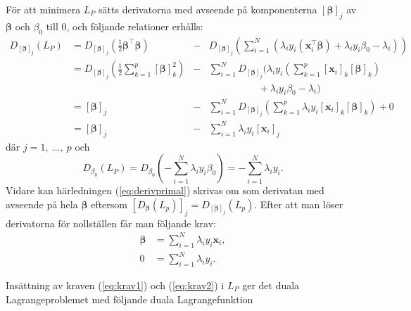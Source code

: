\documentclass[a4paper, 12pt]{report}
\theoremstyle{definition}
\theoremstyle{remark}
\newcommand{\bfbeta}{{\boldsymbol{\beta}}}
\newcommand{\bfx}{\mathbf{x}}
\begin{document}
För att minimera $L_P$ sätts derivatorna med avseende på komponenterna $\left[\bfbeta\right]_j$ av $\bfbeta$ och $\beta_0$ till 0, och följande relationer erhålls:
\begin{equation}\label{eq:derivprimal}
\begin{aligned}
	D_{ \left[\bfbeta\right]_j } \left(L_P\right) &= D_{ \left[\bfbeta\right]_j } \left( \frac{1}{2} \bfbeta^\intercal \bfbeta \right) &- &D_{ \left[\bfbeta\right]_j } \left( \sum_{i=1}^{N} \left( \lambda_i y_i \left( \bfx_i^\intercal\bfbeta \right) + \lambda_i y_i \beta_0 - \lambda_i \right)\right)\\
	&= D_{ \left[\bfbeta\right]_j } \left( \frac{1}{2} \sum_{k=1}^{p} \left[\bfbeta\right]_k^2 \right)
	&- &\sum_{i=1}^{N} D_{ \left[\bfbeta\right]_j }
	\Big(  \lambda_i y_i \left( \sum_{k=1}^{p} \left[\mathbf{x}_i\right]_k \left[ \bfbeta \right]_k \right)\\
	& & &\qquad\qquad\quad+ \lambda_i y_i \beta_0-\lambda_i \Big)\\
	&= [\bfbeta]_j &- &\sum_{i=1}^{N} D_{ \left[\bfbeta\right]_j } \left( \sum_{k=1}^{p} \lambda_i y_i \left[\mathbf{x}_i\right]_k\left[\bfbeta\right]_k \right) + 0\\
	&= [\bfbeta]_j &- &\sum_{i=1}^{N}\lambda_i y_i \left[ \mathbf{x}_i \right]_j
\end{aligned}
\end{equation}
där $j=1,~\dots,~p$ och
\begin{equation*}
	D_{\beta_0}\left(L_P\right) = D_{\beta_0}\left( -\sum_{i=1}^{N} \lambda_i y_i \beta_0 \right) = -\sum_{i=1}^{N} \lambda_i y_i.
\end{equation*}
Vidare kan härledningen (\ref{eq:derivprimal}) skrivas om som derivatan med avseende på \mbox{hela} $\bfbeta$ eftersom $ \left[ D_{ \bfbeta }\left(L_p\right) \right]_j = D_{\left[ \bfbeta \right]_j}\left(L_p\right) $. Efter att man löser derivatorna för noll\-ställen får man följande krav:
\begin{align}\label{eq:krav1}
	\bfbeta &= \sum_{i=1}^{N} \lambda_i y_i \mathbf{x}_i,\\
	0 &= \sum_{i=1}^{N} \lambda_i y_i.\label{eq:krav2}
\end{align}

Insättning av kraven (\ref{eq:krav1}) och (\ref{eq:krav2}) i $L_P$ ger det duala Lagrangeproblemet med följande duala Lagrangefunktion
\end{document}
